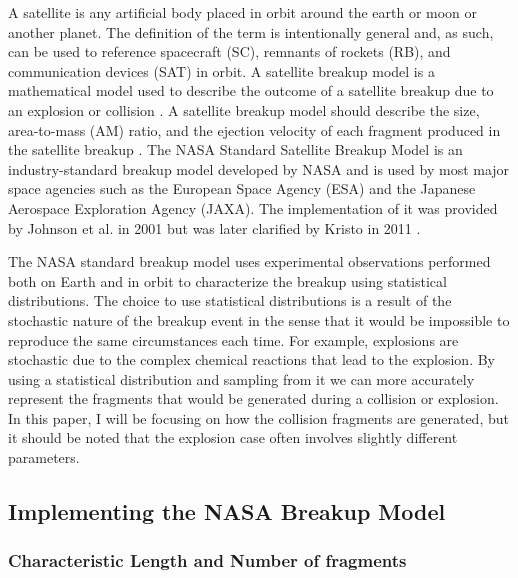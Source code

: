 \documentclass[a4paper, 12pt]{article}
\begin{document}
A satellite is any artificial body placed in orbit around the earth or moon or another planet. The definition of the term is intentionally general and, as such, can be used to reference spacecraft (SC), remnants of rockets (RB), and communication devices (SAT) in orbit.  A satellite breakup model is a mathematical model used to describe the outcome of a satellite breakup due to an explosion or collision \citep{jer_chyi_liou_orbital_nodate}.  A satellite breakup model should describe the size, area-to-mass (AM) ratio, and the ejection velocity of each fragment produced in the satellite breakup \citep{johnson_nasas_2001}. The NASA Standard Satellite Breakup Model is an industry-standard breakup model developed by NASA and is used by most major space agencies such as the European Space Agency (ESA) and the Japanese Aerospace Exploration Agency (JAXA). The implementation of it was provided by Johnson et al. in 2001 \cite{johnson_nasas_2001} but was later clarified by Kristo in 2011 \citep{krisko_proper_2011}. 

The NASA standard breakup model uses experimental observations performed both on Earth and in orbit to characterize the breakup using statistical distributions. The choice to use statistical distributions is a result of the stochastic nature of the breakup event in the sense that it would be impossible to reproduce the same circumstances each time. For example, explosions are stochastic due to the complex chemical reactions that lead to the explosion.  By using a statistical distribution and sampling from it we can more accurately represent the fragments that would be generated during a collision or explosion. In this paper, I will be focusing on how the collision fragments are generated, but it should be noted that the explosion case often involves slightly different parameters.

\newpage

\subsection{Implementing the NASA Breakup Model}

\subsubsection{Characteristic Length and Number of fragments}
\end{document}
